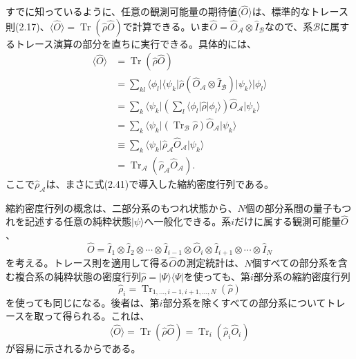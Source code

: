 すでに知っているように、任意の観測可能量の期待値$\langle\hat O\rangle$は、標準的なトレース則(2.17)、$\langle\hat O\rangle=\operatorname{Tr}(\hat\rho\hat O)$で計算できる。いま$\hat O=\hat O_{\mathcal A}\otimes\hat I_{\mathcal B}$なので、系$\mathcal B$に属するトレース演算の部分を直ちに実行できる。具体的には、
\begin{equation}\begin{split}
\langle\hat O\rangle&=\operatorname{Tr}(\hat\rho\hat O)\\
&=\sum_{kl}\langle\phi_l\rvert\langle\psi_k\rvert\hat\rho(\hat O_{\mathcal A}\otimes\hat I_{\mathcal B})\lvert\psi_k\rangle\lvert\phi_l\rangle\\
&=\sum_k\langle\psi_k\rvert\left(\sum_l\langle\phi_l\rvert\hat\rho\lvert\phi_l\rangle\right)\hat O_{\mathcal A}\lvert\psi_k\rangle\\
&=\sum_k\langle\psi_k\rvert(\operatorname{Tr}_{\mathcal B}\hat\rho)\hat O_{\mathcal A}\lvert\psi_k\rangle\\
&\equiv\sum_k\langle\psi_k\rvert\hat\rho_{\mathcal A}\hat O_{\mathcal A}\lvert\psi_k\rangle\\
&=\operatorname{Tr}_{\mathcal A}(\hat\rho_{\mathcal A}\hat O_{\mathcal A}).
\end{split}\tag{2.44}\end{equation}
ここで$\hat\rho_{\mathcal A}$は、まさに式(2.41)で導入した縮約密度行列である。

縮約密度行列の概念は、二部分系のもつれ状態から、$N$個の部分系間の量子もつれを記述する任意の純粋状態$\lvert\psi\rangle$へ一般化できる。系$i$だけに属する観測可能量$\hat O$、
\begin{equation}\hat O=\hat I_1\otimes\hat I_2\otimes\cdots\otimes\hat I_{i-1}\otimes\hat O_i\otimes\hat I_{i+1}\otimes\cdots\otimes\hat I_N\tag{2.45}\end{equation}
を考える。トレース則を適用して得る$\hat O$の測定統計は、$N$個すべての部分系を含む複合系の純粋状態の密度行列$\hat\rho=\lvert\Psi\rangle\langle\Psi\rvert$を使っても、第$i$部分系の縮約密度行列
\begin{equation}\hat\rho_i=\operatorname{Tr}_{1,\ldots,i-1,i+1,\ldots,N}(\hat\rho)\tag{2.46}\end{equation}
を使っても同じになる。後者は、第$i$部分系を除くすべての部分系についてトレースを取って得られる。これは、
\begin{equation}\langle\hat O\rangle=\operatorname{Tr}(\hat\rho\hat O)=\operatorname{Tr}_i(\hat\rho_i\hat O_i)\tag{2.47}\end{equation}
が容易に示されるからである。

